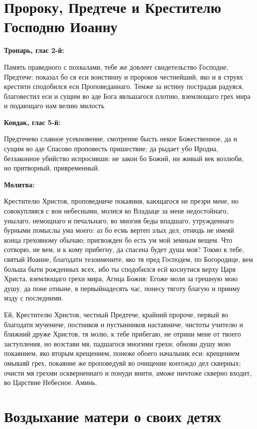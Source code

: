 \section{Пророку, Предтече и Крестителю Господню Иоанну}
 
\bfseries Тропарь, глас 2-й:\normalfont{}


Память праведного с похвалами, тебе же довлеет свидетельство Господне, Предтече: показал бо ся еси воистинну и пророков честнейший, яко и в струях крестити сподобился еси Проповеданнаго. Темже за истину пострадав радуяся, благовестил еси и сущим во аде Бога явльшагося плотию, вземлющаго грех мира и подающаго нам велию милость


\medskip
\bfseries Кондак, глас 5-й:\normalfont{}


Предтечево славное усекновение, смотрение бысть некое Божественное, да и сущим во аде Спасово проповесть пришествие; да рыдает убо Иродиа, беззаконное убийство испросивши: не закон бо Божий, ни живый век возлюби, но притворный, привременный.


\medskip
\bfseries Молитва:\normalfont{}


Крестителю Христов, проповедниче покаяния, кающагося не презри мене, но совокупляяся с вои небесными, молися ко Владыце за мене недостойнаго, унылаго, немощнаго и печальнаго, во многия беды впадшаго, утружденнаго бурными помыслы ума моего: аз бо есмь вертеп злых дел, отнюдь не имеяй конца греховному обычаю; пригвожден бо есть ум мой земным вещем. Что сотворю, не вем, и к кому прибегну, да спасена будет душа моя? Токмо к тебе, святый Иоанне, благодати тезоимените, яко тя пред Господем, по Богородице, вем больша быти рожденных всех, ибо ты сподобился есй коснутися верху Царя Христа, вземлющаго грехи мира, Агнца Божия: Егоже моли за грешную мою душу, да поне отныне, в первыйнадесять час, понесу тяготу благую и прииму мзду с последними. 

Ей, Крестителю Христов, честный Предтече, крайний пророче, первый во благодати мучениче, постников и пустынников наставниче, чистоты учителю и ближний друже Христов, тя молю, к тебе прибегаю, не отрини мене от твоего заступления, но возстави мя, падшагося многими грехи; обнови душу мою покаянием, яко вторым крещением, понеже обоего начальник еси: крещением омываяй грех, покаяние же проповедуяй во очищение коегождо дел скверных; очисти мя грехми оскверненнаго и понуди внити, аможе ничтоже скверно входит, во Царствие Небесное. Аминь.

\section{Воздыхание матери о своих детях}
 


